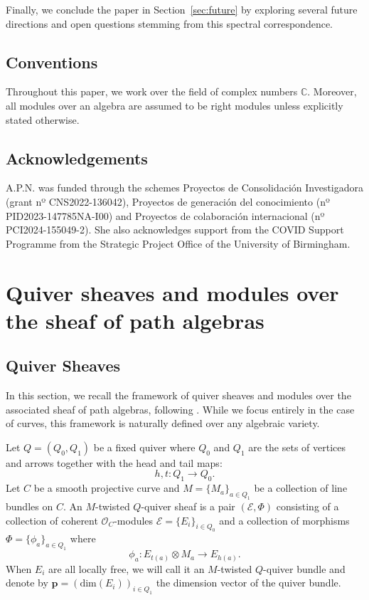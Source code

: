 \documentclass[11pt]{amsart}
\theoremstyle{plain}
\theoremstyle{definition}
\theoremstyle{remark}
\def\C{\mathbb{C}}
\def\O{\mathcal{O}}
\def\m{\mu}
\def\m{\mathcal}
\def\dim{\textrm{dim}}
\begin{document}
Finally, we conclude the paper in Section~\ref{sec:future} by exploring several future directions and open questions stemming from this spectral correspondence.





\subsection{Conventions}
Throughout this paper, we work over the field of complex numbers $\C$. Moreover, all modules over an algebra are assumed to be right modules unless explicitly stated otherwise. 

\subsection{Acknowledgements}{A.P.N. was funded through the schemes Proyectos de Consolidación Investigadora (grant nº CNS2022-136042), Proyectos de generación del conocimiento (nº PID2023-147785NA-I00) and Proyectos de colaboraci\'on internacional (nº PCI2024-155049-2). She also acknowledges support from the COVID Support Programme from the Strategic Project Office of the University of Birmingham.}


\section{Quiver sheaves and modules over the sheaf of path algebras}
\subsection{Quiver Sheaves}
In this section, we recall the framework of quiver sheaves and modules over the associated sheaf of path algebras, following \cite{CGP}. While we focus entirely in the case of curves, this framework is naturally defined over any algebraic variety. 

Let $Q=(Q_0,Q_1)$ be a fixed quiver where $Q_0$ and $Q_1$ are the sets of vertices and arrows together with the head and tail maps:
\begin{equation*}
    h,t:Q_1\to Q_0.
\end{equation*}
Let $C$ be a smooth projective curve and $M=\{M_a\}_{a\in Q_1}$ be a collection of line bundles on $C$. An $M$-twisted $Q$-quiver sheaf is a pair $(\m E, \Phi)$ consisting of a collection of coherent $\O_C$-modules $\m E= \{E_i\}_{i\in Q_0}$ and a collection of morphisms $\Phi =\{\phi_a \}_{a\in Q_1}$ where
\begin{equation*}
    \phi_a : E_{t(a)} \otimes M_a  \to E_{h(a)}.
\end{equation*}
When $E_i$ are all locally free, we will call it an $M$-twisted $Q$-quiver bundle and denote by $\bm{p} = (\dim(E_i))_{i\in Q_1}$ the dimension vector of the quiver bundle. 
\end{document}
